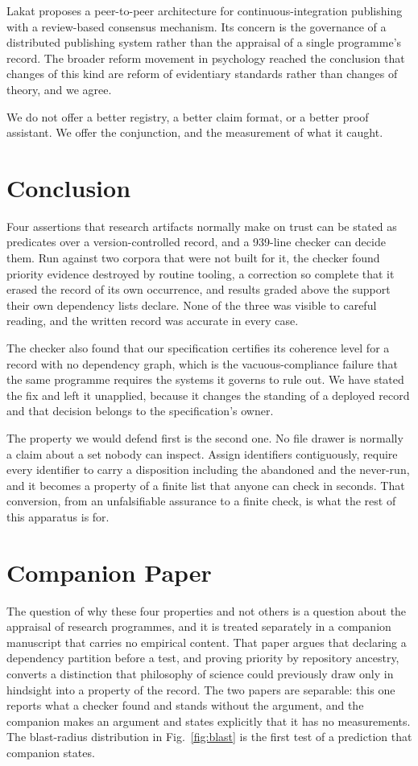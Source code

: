 \documentclass[journal]{IEEEtran}
\begin{document}
Lakat proposes a peer-to-peer architecture for continuous-integration publishing
with a review-based consensus mechanism. Its concern is the governance of a
distributed publishing system rather than the appraisal of a single programme's
record. The broader reform movement in psychology reached the conclusion that
changes of this kind are reform of evidentiary standards rather than changes of
theory, and we agree.

We do not offer a better registry, a better claim format, or a better proof
assistant. We offer the conjunction, and the measurement of what it caught.

\section{Conclusion}

Four assertions that research artifacts normally make on trust can be stated as
predicates over a version-controlled record, and a 939-line checker can decide
them. Run against two corpora that were not built for it, the checker found
priority evidence destroyed by routine tooling, a correction so complete that it
erased the record of its own occurrence, and results graded above the support
their own dependency lists declare. None of the three was visible to careful
reading, and the written record was accurate in every case.

The checker also found that our specification certifies its coherence level for a
record with no dependency graph, which is the vacuous-compliance failure that the
same programme requires the systems it governs to rule out. We have stated the
fix and left it unapplied, because it changes the standing of a deployed record
and that decision belongs to the specification's owner.

The property we would defend first is the second one. No file drawer is normally
a claim about a set nobody can inspect. Assign identifiers contiguously, require
every identifier to carry a disposition including the abandoned and the
never-run, and it becomes a property of a finite list that anyone can check in
seconds. That conversion, from an unfalsifiable assurance to a finite check, is
what the rest of this apparatus is for.

\section*{Companion Paper}

The question of why these four properties and not others is a question about the
appraisal of research programmes, and it is treated separately in a companion
manuscript that carries no empirical content. That paper argues that declaring a
dependency partition before a test, and proving priority by repository ancestry,
converts a distinction that philosophy of science could previously draw only in
hindsight into a property of the record. The two papers are separable: this one
reports what a checker found and stands without the argument, and the companion
makes an argument and states explicitly that it has no measurements. The
blast-radius distribution in Fig.~\ref{fig:blast} is the first test of a
prediction that companion states.
\end{document}
